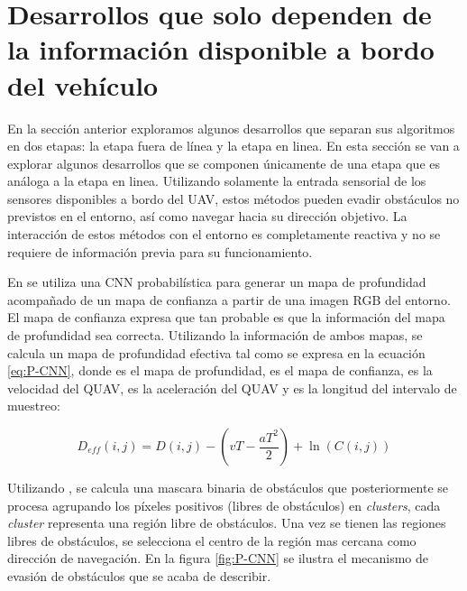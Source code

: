 \section{Desarrollos que solo dependen de la información disponible a bordo del vehículo}

\label{sec::prev-local}

En la sección anterior exploramos algunos desarrollos que separan sus algoritmos en dos etapas: la etapa fuera de línea y la etapa en linea. En esta sección se van a explorar algunos desarrollos que se componen únicamente de una etapa que es análoga a la etapa en linea. Utilizando solamente la entrada sensorial de los sensores disponibles a bordo del UAV, estos métodos pueden evadir obstáculos no previstos en el entorno, así como navegar hacia su dirección objetivo. La interacción de estos métodos con el entorno es completamente reactiva y no se requiere de información previa para su funcionamiento.

En \cite{Yang2021} se utiliza una CNN probabilística para generar un mapa de profundidad acompañado de un mapa de confianza a partir de una imagen RGB del entorno. El mapa de confianza expresa que tan probable es que la información del mapa de profundidad sea correcta. Utilizando la información de ambos mapas, se calcula un mapa de profundidad efectiva tal como se expresa en la ecuación \ref{eq:P-CNN}, donde  es el mapa de profundidad,  es el mapa de confianza,  es la velocidad del QUAV,  es la aceleración del QUAV y  es la longitud del intervalo de muestreo:

\begin{equation}
\label{eq:P-CNN}
    D_{eff}(i,j) = D(i,j) - (vT - \frac{aT^2}{2}) + \ln{(C(i,j))}
\end{equation}

Utilizando , se calcula una mascara binaria de obstáculos  que posteriormente se procesa agrupando los píxeles positivos (libres de obstáculos) en \textit{clusters}, cada \textit{cluster} representa una región libre de obstáculos. Una vez se tienen las regiones libres de obstáculos, se selecciona el centro de la región mas cercana como dirección de navegación. En la figura \ref{fig:P-CNN} se ilustra el mecanismo de evasión de obstáculos que se acaba de describir.

